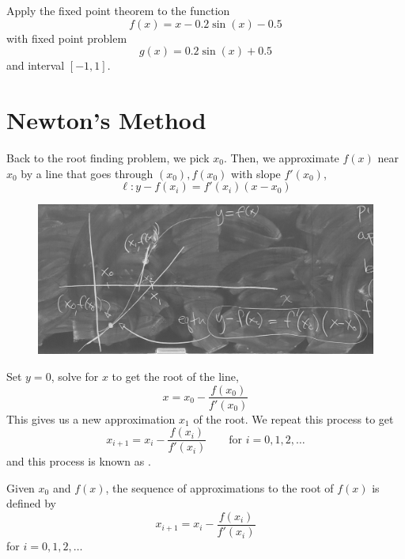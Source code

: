 \begin{example}[Exercise]
    Apply the fixed point theorem to the function \[
        f(x) = x -0.2 \sin(x) - 0.5
    \] with fixed point problem \[
        g(x) = 0.2 \sin(x) + 0.5
    \] and interval \( [-1, 1] \).
\end{example}

\section{Newton's Method}

Back to the root finding problem, we pick \( x_0 \). Then, we approximate \( f(x) \) near \( x_0 \) by a line that goes through \( (x_0), f(x_0) \) with slope \( f'(x_0) \), \[
    \ell: y - f(x_i) = f'(x_i) (x - x_0)
\]

\begin{figure}[H]
    \centering
    \includegraphics[width=0.67\linewidth]{figures/newtons_method.jpeg}
\end{figure}

Set \( y = 0 \), solve for \( x \) to get the root of the line, \[
    x = x_0 - \frac{f(x_0)}{f'(x_0)}
\]
This gives us a new approximation \( x_1 \) of the root. We repeat this process to get \[
    x_{i+1} = x_i - \frac{f(x_i)}{f'(x_i)} \qquad \text{for } i = 0, 1, 2, \dots
\] and this process is known as .

\begin{definition}
    Given \( x_0 \) and \( f(x) \), the sequence of approximations to the root of \( f(x) \) is defined by \[
        x_{i+1} = x_i - \frac{f(x_i)}{f'(x_i)}
    \] for \( i = 0, 1, 2, \dots \)
\end{definition}

